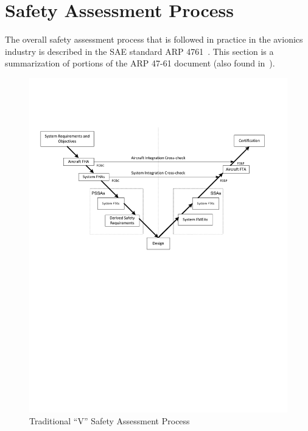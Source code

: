 \section{Safety Assessment Process}
\label{sec:process}

The overall safety assessment process that is followed in practice
in the avionics industry is described in the SAE standard ARP
4761~\cite{SAE:ARP4761}. This section is a summarization of portions of the ARP 47-61 document (also found in~\cite{Joshi05:SafeComp}). 

\begin{figure}
\includegraphics[trim=25 375 0 125, clip, scale=.60]{V}
\caption{Traditional ``V'' Safety Assessment Process} \label{fig:V}
\end{figure}

